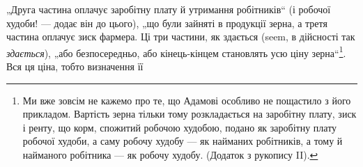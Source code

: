„Друга частина оплачує заробітну плату й утримання робітників“
(і робочої худоби! — додає він до цього), „що були зайняті в продукції
зерна, а третя частина оплачує зиск фармера. Ці три частини, як здається
(seem, в дійсності так \emph{здається}), „або безпосередньо, або кінець-кінцем
становлять усю ціну зерна“\footnote{
Ми вже зовсім не кажемо про те, що Адамові особливо не пощастило з
його прикладом. Вартість зерна тільки тому розкладається на заробітну плату,
зиск і ренту, що корм, спожитий робочою худобою, подано як заробітну плату
робочої худоби, а саму робочу худобу — як найманих робітників, а тому й найманого
робітника — як робочу худобу. (Додаток з рукопису II).
}. Вся ця ціна, тобто визначення її
\parbreak{}  %
